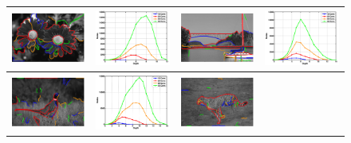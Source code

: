 \begin{figure}[ht]
\centering
\setlength{\tabcolsep}{2pt}
\begin{tabular}{|cc|cc|}
\hline
\includegraphics[width=0.245\linewidth]{figs/124084_cons_stats.pdf} &
\includegraphics[width=0.245\linewidth]{figs/124084_stats.pdf} &
\includegraphics[width=0.245\linewidth]{figs/22090_cons_stats.pdf} &
\includegraphics[width=0.245\linewidth]{figs/22090_stats.pdf} \\
\hline
\includegraphics[width=0.245\linewidth]{figs/43074_cons_stats.pdf} &
\includegraphics[width=0.245\linewidth]{figs/43074_stats.pdf} &
\includegraphics[width=0.245\linewidth]{figs/134008_cons_stats.pdf} &

\end{tabular}
\end{figure}
